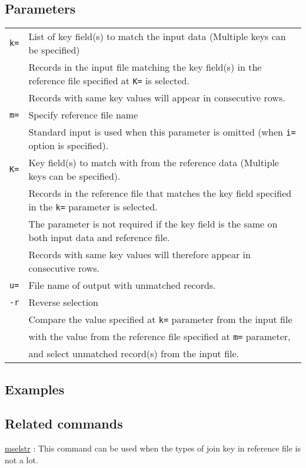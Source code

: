 \subsection*{Parameters}
\begin{table}[htbp]
{\small
\begin{tabular}{ll}
\verb|k=|    & List of key field(s) to match the input data  (Multiple keys can be specified) \\
             & Records in the input file matching the key field(s) in the reference file specified at  \verb|K=| is selected.  \\
             & Records with same key values will appear in consecutive rows.  \\
\verb|m=|    & Specify reference file name\\
             & Standard input is used when this parameter is omitted (when \verb|i=| option is specified). \\
\verb|K=|    & Key field(s) to match with from the reference data (Multiple keys can be specified). \\
             & Records in the reference file that matches the key field specified in the \verb|k=| parameter is selected.   \\
             & The parameter is not required if the key field is the same on both input data and reference file. \\
             & Records with same key values will therefore appear in consecutive rows. \\
\verb|u=|    & File name of output with unmatched records. \\
\verb|-r|    & Reverse selection\\
             & Compare the value specified at \verb|k=| parameter from the input file \\
             & with the value from the reference file specified at \verb|m=| parameter, \\ 
             & and select unmatched record(s) from the input file.  
\end{tabular} 
}
\end{table} 


\subsection*{Examples}


\subsection*{Related commands}
\hyperref[sect:mselstr]{mselstr} : This command can be used when the types of join key in reference file is not a lot.

